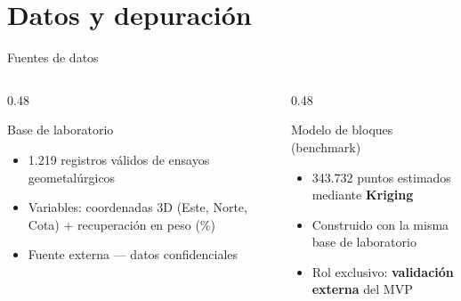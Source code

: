 \documentclass[10pt, aspectratio=169]{beamer}
\newcommand{\hl}[1]{\textcolor{accent}{\textbf{#1}}}
\newcommand{\emp}[1]{\textcolor{primary}{\textbf{#1}}}
\begin{document}
	\section{Datos y depuración}
	
	\begin{frame}{Fuentes de datos}
		\begin{columns}[T]
			\begin{column}{0.48\textwidth}
				\begin{block}{Base de laboratorio}
					\begin{itemize}
						\item 1.219 registros válidos de ensayos geometalúrgicos
						\item Variables: coordenadas 3D (Este, Norte, Cota) + recuperación en peso (\%)
						\item Fuente externa — datos confidenciales
					\end{itemize}
				\end{block}
			\end{column}
			\begin{column}{0.48\textwidth}
				\begin{block}{Modelo de bloques (benchmark)}
					\begin{itemize}
						\item 343.732 puntos estimados mediante \emp{Kriging}
						\item Construido con la misma base de laboratorio
						\item Rol exclusivo: \hl{validación externa} del MVP
					\end{itemize}
				\end{block}
			\end{column}
		\end{columns}
	\end{frame}
	
\end{document}
